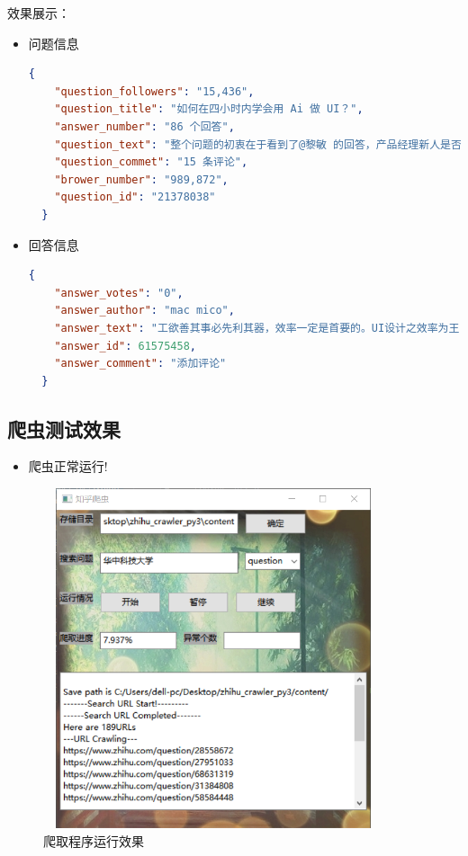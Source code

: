\documentclass[UTF-8,a4paper, 12pt]{article}
\numberwithin{equation}{section}
\begin{document}
效果展示：
\begin{itemize}
  \item 问题信息
  \begin{lstlisting}[language=json]
  {
    "question_followers": "15,436",
    "question_title": "如何在四小时内学会用 Ai 做 UI？",
    "answer_number": "86 个回答",
    "question_text": "整个问题的初衷在于看到了@黎敏 的回答，产品经理新人是否有必要学习Photoshop？ 我这个问题主要在于希望一些新人能速度的进入AI操作，而不必花时间去找教程，需要这个问题回答的人不少。再次谢谢 @黎敏。",
    "question_commet": "15 条评论",
    "brower_number": "989,872",
    "question_id": "21378038"
  }
  \end{lstlisting}
  \item 回答信息
  \begin{lstlisting}[language=json]
  {
    "answer_votes": "0",
    "answer_author": "mac mico",
    "answer_text": "工欲善其事必先利其器，效率一定是首要的。UI设计之效率为王 - 设计与开发之效率 - 知乎专栏",
    "answer_id": 61575458,
    "answer_comment": "添加评论"
  }
  \end{lstlisting}
\end{itemize}
\newpage

\subsection{爬虫测试效果}
\begin{itemize}
  \item 爬虫正常运行!
\end{itemize}
\begin{figure}[!htbp]
  \centering
  \includegraphics[width=10cm,height=10cm]{爬取}
  \caption{爬取程序运行效果}
\end{figure}
\end{document}

